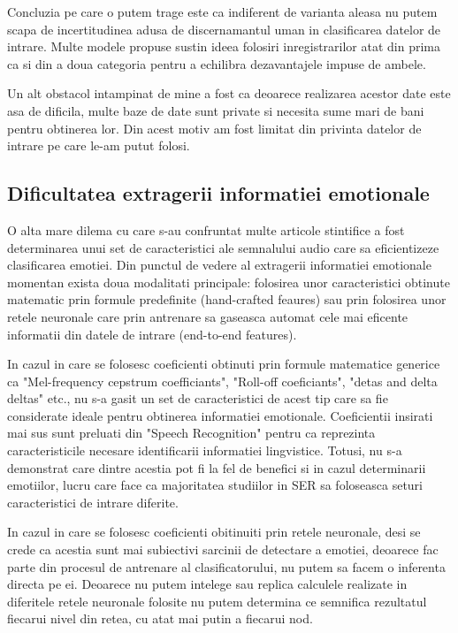 \documentclass[a4paper,12pt]{book}
\begin{document}
					Concluzia pe care o putem trage este ca indiferent de varianta aleasa nu putem scapa de incertitudinea adusa de discernamantul uman in clasificarea datelor de intrare. Multe modele propuse sustin ideea folosiri inregistrarilor atat din prima ca si din a doua categoria pentru a echilibra dezavantajele impuse de ambele. \par
					Un alt obstacol intampinat de mine a fost ca deoarece realizarea acestor date este asa de dificila, multe baze de date sunt private si necesita sume mari de bani pentru obtinerea lor. Din acest motiv am fost limitat din privinta datelor de intrare pe care le-am putut folosi.
				
				\subsection{Dificultatea extragerii informatiei emotionale} \label{dif_fex}
					O alta mare dilema cu care s-au confruntat multe articole stintifice a fost determinarea unui set de caracteristici ale semnalului audio care sa eficientizeze clasificarea emotiei. Din punctul de vedere al extragerii informatiei emotionale momentan exista doua modalitati principale: folosirea unor caracteristici obtinute matematic prin formule predefinite (hand-crafted feaures) sau prin folosirea unor retele neuronale care prin antrenare sa gaseasca automat cele mai eficente informatii din datele de intrare (end-to-end features). \par
					In cazul in care se folosesc coeficienti obtinuti prin formule matematice generice ca "Mel-frequency cepstrum coefficiants", "Roll-off coeficiants", "detas and delta deltas" etc., nu s-a gasit un set de caracteristici de acest tip care sa fie considerate ideale pentru obtinerea informatiei emotionale. Coeficientii insirati mai sus sunt preluati din "Speech Recognition" pentru ca reprezinta caracteristicile necesare identificarii informatiei lingvistice. Totusi, nu s-a demonstrat care dintre acestia pot fi la fel de benefici si in cazul determinarii emotiilor, lucru care face ca majoritatea studiilor in SER sa foloseasca seturi caracteristici de intrare diferite. \par
					In cazul in care se folosesc coeficienti obitinuiti prin retele neuronale, desi se crede ca acestia sunt mai subiectivi sarcinii de detectare a emotiei, deoarece fac parte din procesul de antrenare al clasificatorului, nu putem sa facem o inferenta directa pe ei. Deoarece nu putem intelege sau replica calculele realizate in diferitele retele neuronale folosite nu putem determina ce semnifica rezultatul fiecarui nivel din retea, cu atat mai putin a fiecarui nod. \par
\end{document}
